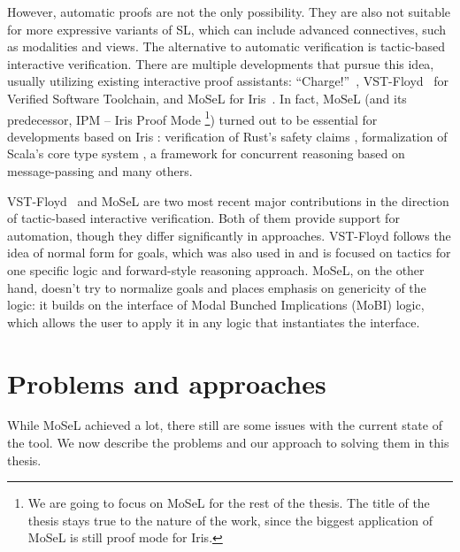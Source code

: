 However, automatic proofs are not the only possibility.
They are also not suitable for more expressive variants of SL, which can include advanced connectives, such as modalities and views.
The alternative to automatic verification is tactic-based interactive verification.
There are multiple developments that pursue this idea, usually utilizing existing interactive proof assistants: ``Charge!''~\cite{bengtsonCharge2012}, VST-Floyd~\cite{caoVSTFloydSeparationLogic2018} for Verified Software Toolchain, and MoSeL for Iris~\cite{krebbersInteractiveProofsHigherorder2017, krebbersMoSeLGeneralExtensible2018}.
{
In fact, MoSeL (and its predecessor, IPM -- Iris Proof Mode \footnote{We are going to focus on MoSeL for the rest of the thesis. The title of the thesis stays true to the nature of the work, since the biggest application of MoSeL is still proof mode for Iris.}) turned out to be essential for developments based on Iris \cite{krebbersMoSeLGeneralExtensible2018, jungUnderstandingEvolvingRust2020}: verification of Rust's safety claims \cite{jungRustBeltSecuringFoundations2018, dangRustBeltMeetsRelaxed2019}, formalization of Scala's core type system \cite{giarrussoScalaStepbystepSoundness2020}, a framework for concurrent reasoning based on message-passing \cite{hinrichsenActrisSessiontypeBased2019} and many others.}

VST-Floyd~\cite{caoVSTFloydSeparationLogic2018} and MoSeL \cite{krebbersMoSeLGeneralExtensible2018} are two most recent major contributions in the direction of tactic-based interactive verification.
Both of them provide support for automation, though they differ significantly in approaches.
VST-Floyd follows the idea of normal form for goals, which was also used in \cite{bengtsonCharge2012} and is focused on tactics for one specific logic and forward-style reasoning approach.
MoSeL, on the other hand, doesn't try to normalize goals and places emphasis on genericity of the logic: it builds on the interface of Modal Bunched Implications (MoBI) logic, which allows the user to apply it in any logic that instantiates the interface.

\section{Problems and approaches}
\label{sec:problems-approaches-intro}

While MoSeL achieved a lot, there still are some issues with the current state of the tool.
We now describe the problems and our approach to solving them in this thesis.

